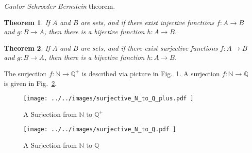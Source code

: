 \documentclass{article}
\theoremstyle{plain}
\newtheorem{theorem}{Theorem}[section]
\theoremstyle{normal}
\begin{document}
        \textit{Cantor-Schroeder-Bernstein} theorem.
        \begin{theorem}
            If $A$ and $B$ are sets, and if there exist injective functions
            $f:A\rightarrow{B}$ and $g:B\rightarrow{A}$, then there is a
            bijective function $h:A\rightarrow{B}$.
        \end{theorem}
        \begin{theorem}
            If $A$ and $B$ are sets, and if there exist surjective functions
            $f:A\rightarrow{B}$ and $g:B\rightarrow{A}$, then there is a
            bijective function $h:A\rightarrow{B}$.
        \end{theorem}
        The surjection $f:\mathbb{N}\rightarrow\mathbb{Q}^{+}$ is described
        via picture in Fig.~\ref{fig:surjective_N_to_Q_plus}. A surjection
        $f:\mathbb{N}\rightarrow\mathbb{Q}$ is given in
        Fig.~\ref{fig:surjective_N_to_Q}.
        \begin{figure}
            \centering
            \texttt{[image: ../../images/surjective\_N\_to\_Q\_plus.pdf ]}
            \caption{A Surjection from $\mathbb{N}$ to $\mathbb{Q}^{+}$}
            \label{fig:surjective_N_to_Q_plus}
        \end{figure}
        \begin{figure}
            \centering
            \texttt{[image: ../../images/surjective\_N\_to\_Q.pdf ]}
            \caption{A Surjection from $\mathbb{N}$ to $\mathbb{Q}$}
            \label{fig:surjective_N_to_Q}
        \end{figure}
\end{document}
